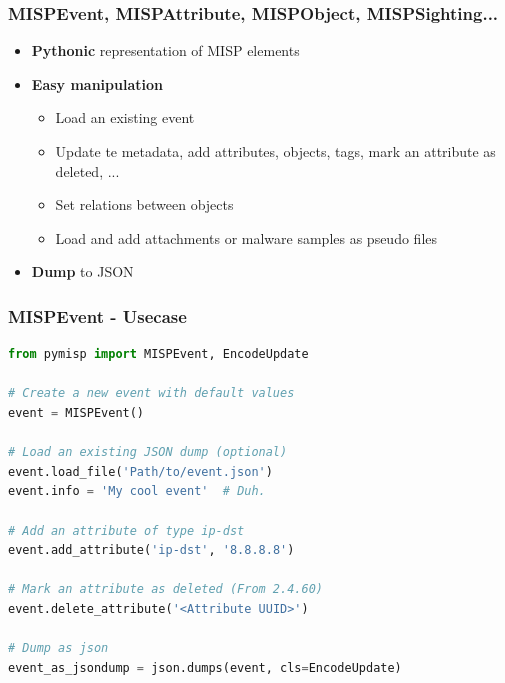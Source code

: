\begin{frame}[fragile]
    \frametitle{MISPEvent, MISPAttribute, MISPObject, MISPSighting...}
    \begin{itemize}
        \item {\bf Pythonic} representation of MISP elements
        \item {\bf Easy manipulation}
        \begin{itemize}
            \item Load an existing event
            \item Update te metadata, add attributes, objects, tags, mark an attribute as deleted, ...
            \item Set relations between objects
            \item Load and add attachments or malware samples as pseudo files
        \end{itemize}
        \item {\bf Dump} to JSON
    \end{itemize}
\end{frame}

\begin{frame}[fragile]
    \frametitle{MISPEvent - Usecase}
    \begin{adjustbox}{width=\textwidth,height=3cm,keepaspectratio}
        \begin{lstlisting}[language=Python,firstnumber=1]
from pymisp import MISPEvent, EncodeUpdate

# Create a new event with default values
event = MISPEvent()

# Load an existing JSON dump (optional)
event.load_file('Path/to/event.json')
event.info = 'My cool event'  # Duh.

# Add an attribute of type ip-dst
event.add_attribute('ip-dst', '8.8.8.8')

# Mark an attribute as deleted (From 2.4.60)
event.delete_attribute('<Attribute UUID>')

# Dump as json
event_as_jsondump = json.dumps(event, cls=EncodeUpdate)
        \end{lstlisting}
    \end{adjustbox}
\end{frame}

